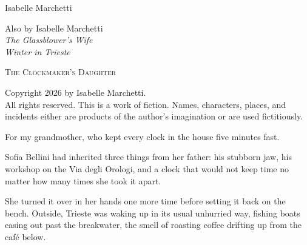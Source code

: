 \documentclass{novel}
\begin{document}
\frontmatter

\thispagestyle{empty}
\begin{ChapterStart}[8]
\vspace{\nbs}
\vspace{\nbs}
{\centering Isabelle Marchetti\par}
\end{ChapterStart}

\clearpage
\thispagestyle{empty}
\vspace*{\fill}
\begin{center}
Also by Isabelle Marchetti\\
\emph{The Glassblower's Wife}\\
\emph{Winter in Trieste}
\end{center}
\vspace*{\fill}

\clearpage
\thispagestyle{empty}
\vspace*{\fill}
\begin{center}
\textsc{The Clockmaker's Daughter}\par
Copyright \textcopyright{} 2026 by Isabelle Marchetti.\\
All rights reserved. This is a work of fiction. Names, characters,
places, and incidents either are products of the author's imagination
or are used fictitiously.
\end{center}
\vspace*{\fill}

\clearpage
\thispagestyle{empty}
\vspace*{\fill}
\begin{center}
For my grandmother, who kept every clock in the house five minutes fast.
\end{center}
\vspace*{\fill}

\mainmatter

\clearpage
\begin{ChapterStart}
\vspace*{2\nbs}
\end{ChapterStart}
Sofia Bellini had inherited three things from her father: his stubborn
jaw, his workshop on the Via degli Orologi, and a clock that would not
keep time no matter how many times she took it apart.

She turned it over in her hands one more time before setting it back
on the bench. Outside, Trieste was waking up in its usual unhurried
way, fishing boats easing out past the breakwater, the smell of
roasting coffee drifting up from the café below.
\end{document}
